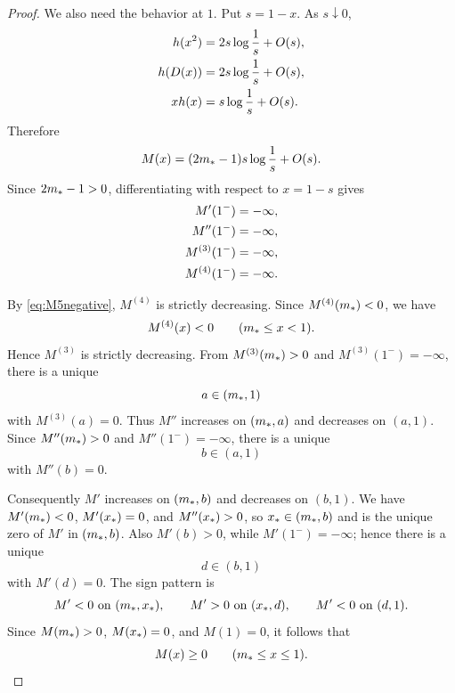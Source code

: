 \begin{proof}
We also need the behavior at \(1\).  Put \(s=1-x\).  As \(s\downarrow0\),
\begin{align}\label{eq:endpoint_h}
  h(x^2)&=2s\log\frac1s+O(s),\notag\\
  h(D(x))&=2s\log\frac1s+O(s),\notag\\
  xh(x)&=s\log\frac1s+O(s).
\end{align}
Therefore
\begin{equation}\label{eq:M_endpoint_expand}
  M(x)=(2m_*-1)s\log\frac1s+O(s).
\end{equation}
Since \(2m_*-1>0\), differentiating with respect to \(x=1-s\) gives
\begin{align}\label{eq:M_deriv_endpoint}
  M'(1^-)&=-\infty,\notag\\
  M''(1^-)&=-\infty,\notag\\
  M^{(3)}(1^-)&=-\infty,\notag\\
  M^{(4)}(1^-)&=-\infty.
\end{align}

By \eqref{eq:M5negative}, \(M^{(4)}\) is strictly decreasing.  Since \(M^{(4)}(m_*)<0\), we have
\begin{equation}\label{eq:M4neg}
  M^{(4)}(x)<0\qquad(m_*\le x<1).
\end{equation}
Hence \(M^{(3)}\) is strictly decreasing.  From \(M^{(3)}(m_*)>0\) and \(M^{(3)}(1^-)=-\infty\), there is a unique
\begin{equation}\label{eq:a_zero}
  a\in(m_*,1)
\end{equation}
with \(M^{(3)}(a)=0\).  Thus \(M''\) increases on \((m_*,a)\) and decreases on \((a,1)\).  Since \(M''(m_*)>0\) and \(M''(1^-)=-\infty\), there is a unique
\begin{equation}\label{eq:b_zero}
  b\in(a,1)
\end{equation}
with \(M''(b)=0\).

Consequently \(M'\) increases on \((m_*,b)\) and decreases on \((b,1)\).  We have \(M'(m_*)<0\), \(M'(x_*)=0\), and \(M''(x_*)>0\), so \(x_*\in(m_*,b)\) and is the unique zero of \(M'\) in \((m_*,b)\).  Also \(M'(b)>0\), while \(M'(1^-)=-\infty\); hence there is a unique
\begin{equation}\label{eq:d_zero}
  d\in(b,1)
\end{equation}
with \(M'(d)=0\).  The sign pattern is
\begin{equation}\label{eq:Mprime_pattern}
  M'<0\text{ on }(m_*,x_*),\qquad
  M'>0\text{ on }(x_*,d),\qquad
  M'<0\text{ on }(d,1).
\end{equation}
Since \(M(m_*)>0\), \(M(x_*)=0\), and \(M(1)=0\), it follows that
\begin{equation}\label{eq:M_ge_mstar}
  M(x)\ge0\qquad(m_*\le x\le1).
\end{equation}


\end{proof}
